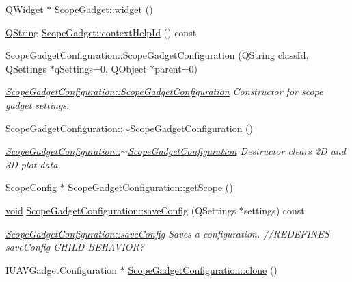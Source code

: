 \begin{DoxyCompactItemize}
\item 
Q\-Widget $\ast$ \hyperlink{group___scope_plugin_ga64f4c7f063a7d85c79728a770d411cb2}{Scope\-Gadget\-::widget} ()
\item 
\hyperlink{group___u_a_v_objects_plugin_gab9d252f49c333c94a72f97ce3105a32d}{Q\-String} \hyperlink{group___scope_plugin_gad4bf2378223ce3ef188714a3ce9d9fb3}{Scope\-Gadget\-::context\-Help\-Id} () const 
\item 
\hyperlink{group___scope_plugin_ga08c3c3b7c00b5fca9d78f97f6ae66381}{Scope\-Gadget\-Configuration\-::\-Scope\-Gadget\-Configuration} (\hyperlink{group___u_a_v_objects_plugin_gab9d252f49c333c94a72f97ce3105a32d}{Q\-String} class\-Id, Q\-Settings $\ast$q\-Settings=0, Q\-Object $\ast$parent=0)
\begin{DoxyCompactList}\small\item\em \hyperlink{group___scope_plugin_ga08c3c3b7c00b5fca9d78f97f6ae66381}{Scope\-Gadget\-Configuration\-::\-Scope\-Gadget\-Configuration} Constructor for scope gadget settings. \end{DoxyCompactList}\item 
\hyperlink{group___scope_plugin_ga3a4bf5369afe5c90183e5de5b9a64c99}{Scope\-Gadget\-Configuration\-::$\sim$\-Scope\-Gadget\-Configuration} ()
\begin{DoxyCompactList}\small\item\em \hyperlink{group___scope_plugin_ga3a4bf5369afe5c90183e5de5b9a64c99}{Scope\-Gadget\-Configuration\-::$\sim$\-Scope\-Gadget\-Configuration} Destructor clears 2\-D and 3\-D plot data. \end{DoxyCompactList}\item 
\hyperlink{class_scope_config}{Scope\-Config} $\ast$ \hyperlink{group___scope_plugin_gad77c6650f45b62d917a93db28ddbcc56}{Scope\-Gadget\-Configuration\-::get\-Scope} ()
\item 
\hyperlink{group___u_a_v_objects_plugin_ga444cf2ff3f0ecbe028adce838d373f5c}{void} \hyperlink{group___scope_plugin_ga1019b17dbc40bb39cb4deb12fe85912e}{Scope\-Gadget\-Configuration\-::save\-Config} (Q\-Settings $\ast$settings) const 
\begin{DoxyCompactList}\small\item\em \hyperlink{group___scope_plugin_ga1019b17dbc40bb39cb4deb12fe85912e}{Scope\-Gadget\-Configuration\-::save\-Config} Saves a configuration. //\-R\-E\-D\-E\-F\-I\-N\-E\-S save\-Config C\-H\-I\-L\-D B\-E\-H\-A\-V\-I\-O\-R? \end{DoxyCompactList}\item 
I\-U\-A\-V\-Gadget\-Configuration $\ast$ \hyperlink{group___scope_plugin_ga85df073ffa0cd27035a937df7c2cff8e}{Scope\-Gadget\-Configuration\-::clone} ()

\end{DoxyCompactItemize}
